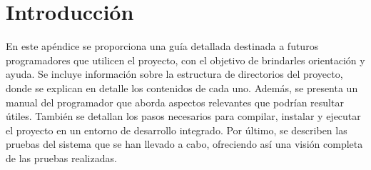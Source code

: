 
\section{Introducción}
En este apéndice se proporciona una guía detallada destinada a futuros programadores que utilicen el proyecto, con el objetivo de brindarles orientación y ayuda. Se incluye información sobre la estructura de directorios del proyecto, donde se explican en detalle los contenidos de cada uno. Además, se presenta un manual del programador que aborda aspectos relevantes que podrían resultar útiles. También se detallan los pasos necesarios para compilar, instalar y ejecutar el proyecto en un entorno de desarrollo integrado. Por último, se describen las pruebas del sistema que se han llevado a cabo, ofreciendo así una visión completa de las pruebas realizadas.
